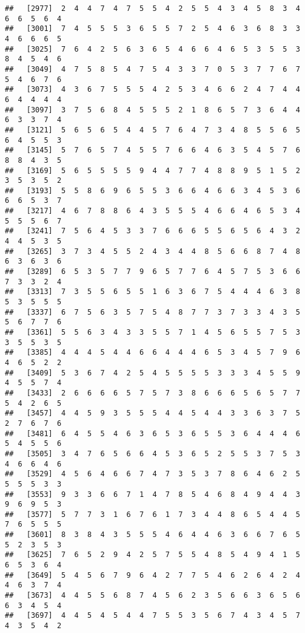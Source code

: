 \documentclass[
]{book}
\begin{document}
\begin{verbatim}
##   [2977]  2  4  4  7  4  7  5  5  4  2  5  5  4  3  4  5  8  3  4  6  6  5  6  4
##   [3001]  7  4  5  5  5  3  6  5  5  7  2  5  4  6  3  6  8  3  3  4  6  6  6  5
##   [3025]  7  6  4  2  5  6  3  6  5  4  6  6  4  6  5  3  5  5  3  8  4  5  4  6
##   [3049]  4  7  5  8  5  4  7  5  4  3  3  7  0  5  3  7  7  6  7  5  4  6  7  6
##   [3073]  4  3  6  7  5  5  5  4  2  5  3  4  6  6  2  4  7  4  4  6  4  4  4  4
##   [3097]  3  7  5  6  8  4  5  5  5  2  1  8  6  5  7  3  6  4  4  6  3  3  7  4
##   [3121]  5  6  5  6  5  4  4  5  7  6  4  7  3  4  8  5  5  6  5  6  4  5  5  3
##   [3145]  5  7  6  5  7  4  5  5  7  6  6  4  6  3  5  4  5  7  6  8  8  4  3  5
##   [3169]  5  6  5  5  5  5  9  4  4  7  7  4  8  8  9  5  1  5  2  3  5  3  5  2
##   [3193]  5  5  8  6  9  6  5  5  3  6  6  4  6  6  3  4  5  3  6  6  6  5  3  7
##   [3217]  4  6  7  8  8  6  4  3  5  5  5  4  6  6  4  6  5  3  4  5  5  5  6  7
##   [3241]  7  5  6  4  5  3  3  7  6  6  6  5  5  6  5  6  4  3  2  4  4  5  3  5
##   [3265]  3  7  3  4  5  5  2  4  3  4  4  8  5  6  6  8  7  4  8  6  3  6  3  6
##   [3289]  6  5  3  5  7  7  9  6  5  7  7  6  4  5  7  5  3  6  6  7  3  3  2  4
##   [3313]  7  3  5  5  6  5  5  1  6  3  6  7  5  4  4  4  6  3  8  5  3  5  5  5
##   [3337]  6  7  5  6  3  5  7  5  4  8  7  7  3  7  3  3  4  3  5  5  6  7  7  6
##   [3361]  5  5  6  3  4  3  3  5  5  7  1  4  5  6  5  5  7  5  3  3  5  5  3  5
##   [3385]  4  4  4  5  4  4  6  6  4  4  4  6  5  3  4  5  7  9  6  4  6  5  2  2
##   [3409]  5  3  6  7  4  2  5  4  5  5  5  5  3  3  3  4  5  5  9  4  5  5  7  4
##   [3433]  2  6  6  6  6  5  7  5  7  3  8  6  6  6  5  6  5  7  7  5  4  2  6  5
##   [3457]  4  4  5  9  3  5  5  5  4  4  5  4  4  3  3  6  3  7  5  2  7  6  7  6
##   [3481]  6  4  5  5  4  6  3  6  5  3  6  5  5  3  6  4  4  4  6  5  4  5  5  6
##   [3505]  3  4  7  6  5  6  6  4  5  3  6  5  2  5  5  3  7  5  3  4  6  6  4  6
##   [3529]  4  5  6  4  6  6  7  4  7  3  5  3  7  8  6  4  6  2  5  5  5  5  3  3
##   [3553]  9  3  3  6  6  7  1  4  7  8  5  4  6  8  4  9  4  4  3  9  6  9  5  3
##   [3577]  5  7  7  3  1  6  7  6  1  7  3  4  4  8  6  5  4  4  5  7  6  5  5  5
##   [3601]  8  3  8  4  3  5  5  5  4  6  4  4  6  3  6  6  7  6  5  5  2  3  5  3
##   [3625]  7  6  5  2  9  4  2  5  7  5  5  4  8  5  4  9  4  1  5  6  5  3  6  4
##   [3649]  5  4  5  6  7  9  6  4  2  7  7  5  4  6  2  6  4  2  4  4  6  3  7  4
##   [3673]  4  4  5  5  6  8  7  4  5  6  2  3  5  6  6  3  6  5  6  6  3  4  5  4
##   [3697]  4  4  5  4  5  4  4  7  5  5  3  5  6  7  4  3  4  5  7  4  3  5  4  2

\end{verbatim}
\end{document}
